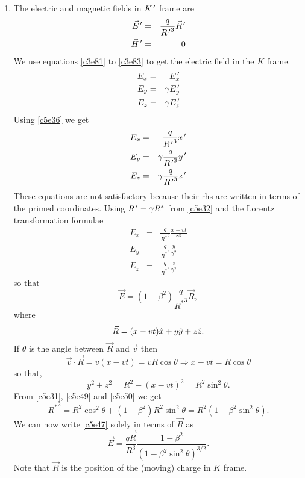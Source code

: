 \begin{enumerate}
\item The electric and magnetic fields in $K^{\,\prime}$ frame are
\begin{eqnarray}
\vec{E}^{\,\prime} &=& \frac{q}{{R^{\,\prime}}^3}\vec{R}^{\,\prime} \label{c5e36} \\
\vec{H}^{\,\prime} &=& 0 \label{c5e37}
\end{eqnarray}
We use equations \eqref{c3e81} to \eqref{c3e83} to get the electric field in the
$K$ frame.
\begin{eqnarray}
E_x &=& E_x^{\,\prime} \label{c5e38} \\
E_y &=& \gamma E_y^{\,\prime} \label{c5e39} \\
E_z &=& \gamma E_z^{\,\prime} \label{c5e40}
\end{eqnarray}
Using \eqref{c5e36} we get
\begin{eqnarray}
E_x &=& \frac{q}{{R^{\,\prime}}^3}x^{\,\prime} \label{c5e41} \\
E_y &=& \gamma\frac{q}{{R^{\,\prime}}^3}y^{\,\prime} \label{c5e42} \\
E_z &=& \gamma\frac{q}{{R^{\,\prime}}^3}z^{\,\prime} \label{c5e43}
\end{eqnarray}
These equations are not satisfactory because their rhs are written in terms of
the primed coordinates. Using $R^{\,\prime} = \gamma R^\ast$ from \eqref{c5e32} and the
Lorentz transformation formulae
\begin{eqnarray}
E_x &=& \frac{q}{{R^\ast}^3}\frac{x - vt}{\gamma^2} \label{c5e44} \\
E_y &=& \frac{q}{{R^\ast}^3}\frac{y}{\gamma^2} \label{c5e45} \\
E_z &=& \frac{q}{{R^\ast}^3}\frac{z}{\gamma^2} \label{c5e46}
\end{eqnarray}
so that
\begin{equation}\label{c5e47}
\vec{E} = (1 - \beta^2)\frac{q}{{R^\ast}^3}\vec{R},
\end{equation}
where
\begin{equation}\label{c5e48}
\vec{R} = (x - vt)\hat{x} + y\hat{y} + z\hat{z}.
\end{equation}
If $\theta$ is the angle between $\vec{R}$ and $\vec{v}$ then
\begin{equation}\label{c5e49}
\vec{v}\cdot\vec{R} = v(x - vt) = vR\cos\theta \Rightarrow x - vt = R\cos\theta
\end{equation}
so that,
\begin{equation}\label{c5e50}
y^2 + z^2 = R^2 - (x - vt)^2 = R^2\sin^2\theta.
\end{equation}
From \eqref{c5e31}, \eqref{c5e49} and \eqref{c5e50} we get
\begin{equation}\label{c5e51}
{R^\ast}^2 = R^2\cos^2\theta + (1 - \beta^2)R^2\sin^2\theta = 
R^2(1 - \beta^2\sin^2\theta).
\end{equation}
We can now write \eqref{c5e47} solely in terms of $\vec{R}$ as
\begin{equation}\label{c5e52}
\vec{E} = \frac{q\vec{R}}{R^3} 
\frac{1 - \beta^2}{(1 - \beta^2\sin^2\theta)^{3/2}}.
\end{equation}
Note that $\vec{R}$ is the position of the (moving) charge in $K$ frame.


\end{enumerate}
